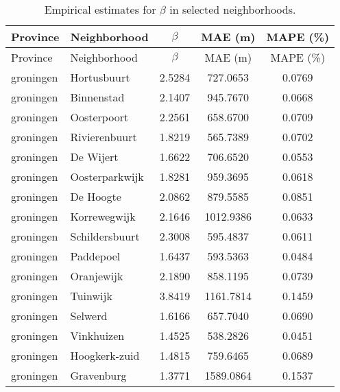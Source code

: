 \begin{longtable}{llccc}
	\caption{Empirical estimates for $\beta$ in selected neighborhoods.} \label{tab:results} \\
	\hline
	Province      & Neighborhood                     & $\beta$ & MAE (m)   & MAPE (\%)       \\
	\hline
	\endfirsthead
	\hline
	Province      & Neighborhood                     & $\beta$ & MAE (m)   & MAPE (\%)       \\
	\hline
	\endhead
	groningen     & Hortusbuurt                      & 2.5284  & 727.0653  & 0.0769          \\
	groningen     & Binnenstad                       & 2.1407  & 945.7670  & 0.0668          \\
	groningen     & Oosterpoort                      & 2.2561  & 658.6700  & 0.0709          \\
	groningen     & Rivierenbuurt                    & 1.8219  & 565.7389  & 0.0702          \\
	groningen     & De Wijert                        & 1.6622  & 706.6520  & 0.0553          \\
	groningen     & Oosterparkwijk                   & 1.8281  & 959.3695  & 0.0618          \\
	groningen     & De Hoogte                        & 2.0862  & 879.5585  & 0.0851          \\
	groningen     & Korrewegwijk                     & 2.1646  & 1012.9386 & 0.0633          \\
	groningen     & Schildersbuurt                   & 2.3008  & 595.4837  & 0.0611          \\
	groningen     & Paddepoel                        & 1.6437  & 593.5363  & 0.0484          \\
	groningen     & Oranjewijk                       & 2.1890  & 858.1195  & 0.0739          \\
	groningen     & Tuinwijk                         & 3.8419  & 1161.7814 & 0.1459          \\
	groningen     & Selwerd                          & 1.6166  & 657.7040  & 0.0690          \\
	groningen     & Vinkhuizen                       & 1.4525  & 538.2826  & 0.0451          \\
	groningen     & Hoogkerk-zuid                    & 1.4815  & 759.6465  & 0.0689          \\
	groningen     & Gravenburg                       & 1.3771  & 1589.0864 & 0.1537          \\

\end{longtable}
